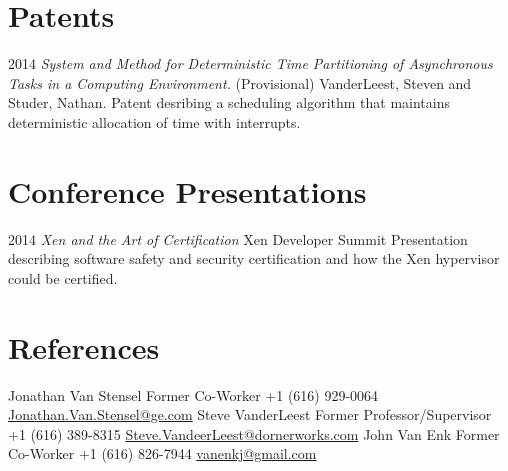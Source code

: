 \documentclass[print]{template/friggeri-cv} %
\begin{document}
\newpage

\section{Patents}

\begin{entrylist}
\longentry
{2014}
{\emph{System and Method for Deterministic Time Partitioning of Asynchronous Tasks in a Computing Environment.} (Provisional)}
{VanderLeest, Steven and Studer, Nathan.}
{Patent desribing a scheduling algorithm that maintains deterministic allocation of time with interrupts.}
\end{entrylist}

\section{Conference Presentations}

\begin{entrylist}
\longentry
{2014}
{\emph{Xen and the Art of Certification}}
{Xen Developer Summit}
{Presentation describing software safety and security certification and how the Xen hypervisor could be certified.}
\end{entrylist}

\section{References}

\begin{entrylist}
\nodateentry
{Jonathan Van Stensel}
{Former Co-Worker}
{+1 (616) 929-0064 \href{mailto:Jonathan.Van.Stensel@ge.com}{Jonathan.Van.Stensel@ge.com}}
\nodateentry
{Steve VanderLeest}
{Former Professor/Supervisor}
{+1 (616) 389-8315 \href{mailto:Steve.VanderLeest@dornerworks.com}{Steve.VandeerLeest@dornerworks.com}}
\nodateentry
{John Van Enk}
{Former Co-Worker}
{+1 (616) 826-7944 \href{mailto:vanenkj@gmail.com}{vanenkj@gmail.com}}
\end{entrylist}



\end{document}
